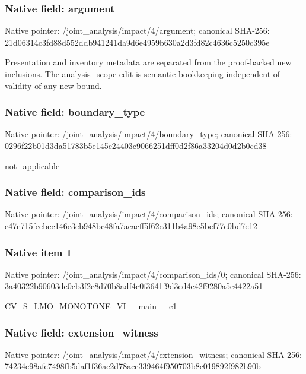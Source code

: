 \documentclass[10pt,a4paper]{article}
\begin{document}
\subsubsection{Native field: argument}
Native pointer: /joint\_\allowbreak{}analysis/impact/4/argument; canonical SHA-256: 21d06314c3fd88d552ddb941241da9d6e4959b630a2d3fd82c4636c5250c395e

\begingroup\raggedright\sloppy Presentation and inventory metadata are separated from the proof-backed new inclusions. The analysis\_\allowbreak{}scope edit is semantic bookkeeping independent of validity of any new bound.\par\endgroup

\subsubsection{Native field: boundary\_\allowbreak{}type}
Native pointer: /joint\_\allowbreak{}analysis/impact/4/boundary\_\allowbreak{}type; canonical SHA-256: 0296f22b01d3da51783b5e145c24403c9066251dff0d2f86a33204d0d2b0cd38

\begingroup\raggedright\sloppy not\_\allowbreak{}applicable\par\endgroup

\subsubsection{Native field: comparison\_\allowbreak{}ids}
Native pointer: /joint\_\allowbreak{}analysis/impact/4/comparison\_\allowbreak{}ids; canonical SHA-256: e47e715feebec146e3cb948bc48fa7aeacff5f62c311b4a98e5bef77e0bd7e12

\subsubsection{Native item 1}
Native pointer: /joint\_\allowbreak{}analysis/impact/4/comparison\_\allowbreak{}ids/0; canonical SHA-256: 3a40322b90603de0cb3f2c8d70b8adf4c0f3641f9d3ed4e42f9280a5e4422a51

\begingroup\raggedright\sloppy CV\_\allowbreak{}S\_\allowbreak{}LMO\_\allowbreak{}MONOTONE\_\allowbreak{}VI\_\allowbreak{}\_\allowbreak{}main\_\allowbreak{}\_\allowbreak{}c1\par\endgroup

\subsubsection{Native field: extension\_\allowbreak{}witness}
Native pointer: /joint\_\allowbreak{}analysis/impact/4/extension\_\allowbreak{}witness; canonical SHA-256: 74234e98afe7498fb5daf1f36ac2d78acc339464f950703b8c019892f982b90b
\end{document}
